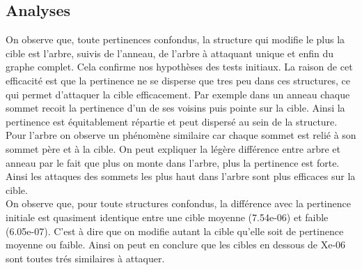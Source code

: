 \documentclass[a4paper,11pt]{article}
\begin{document}
	\subsection{Analyses}
		On observe que, toute pertinences confondus, la structure qui modifie le plus la cible est l'arbre, suivis de l'anneau, de l'arbre à attaquant unique et enfin du graphe complet.
		Cela confirme nos hypothèses des tests initiaux. La raison de cet efficacité est que la pertinence ne se disperse que tres peu dans ces structures, ce qui permet d'attaquer 
		la cible efficacement. Par exemple dans un anneau chaque sommet recoit la pertinence d'un de ses voisins puis pointe sur la cible. Ainsi la pertinence est équitablement répartie et peut dispersé au sein de la structure.
		Pour l'arbre on observe un phénomène similaire car chaque sommet est relié à son sommet père et à la cible. On peut expliquer la légère différence entre arbre et anneau par le fait 
		que plus on monte dans l'arbre, plus la pertinence est forte. Ainsi les attaques des sommets les plus haut dans l'arbre sont plus efficaces sur la cible.\\
		
		On observe que, pour toute structures confondus, la différence avec la pertinence initiale est quasiment identique entre une cible moyenne (7.54e-06) et faible (6.05e-07).
		C'est à dire que on modifie autant la cible qu'elle soit de pertinence moyenne ou faible. Ainsi on peut en conclure que les cibles en dessous de Xe-06 sont toutes trés similaires à attaquer.\\
		
\end{document}
